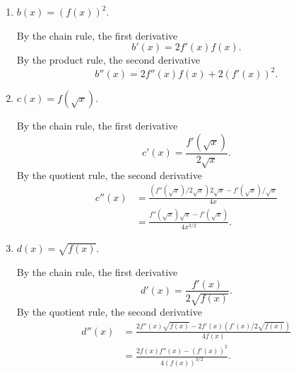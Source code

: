 \begin{enumerate}
\begin{enumerate}
		\item
		$b(x)=(f(x))^2$.
		\begin{solution}
			By the chain rule, the first derivative
			\[ b'(x)=2f'(x)f(x). \]
			By the product rule, the second derivative
			\[ b''(x)=2f''(x)f(x)+2(f'(x))^2. \]
		\end{solution}

		\item
		$c(x)=f(\sqrt{x})$.
		\begin{solution}
			By the chain rule, the first derivative
			\[ c'(x)=\frac{f'(\sqrt{x})}{2\sqrt{x}}. \]
			By the quotient rule, the second derivative
			\begin{align}
				c''(x)
				&= \frac{(f''(\sqrt{x})/2\sqrt{x})2\sqrt{x}%
					-f'(\sqrt{x})/\sqrt{x}}{4x}\\
				&= \frac{f''(\sqrt{x})\sqrt{x}-f'(\sqrt{x})}{4x^{3/2}}.
			\end{align}
		\end{solution}

		\item
		$d(x)=\sqrt{f(x)}$.
		\begin{solution}
			By the chain rule, the first derivative
			\[ d'(x)=\frac{f'(x)}{2\sqrt{f(x)}}. \]
			By the quotient rule, the second derivative
			\begin{align}
				d''(x)
				&= \frac{2f''(x)\sqrt{f(x)}-2f'(x)(f'(x)/2\sqrt{f(x)})}%
					{4f(x)}\\
				&= \frac{2f(x)f''(x)-(f'(x))^2}{4(f(x))^{3/2}}.
			\end{align}
		\end{solution}

	\end{enumerate}

\end{enumerate}
